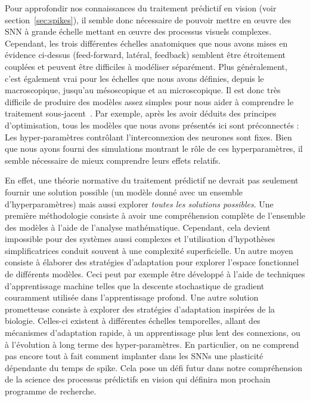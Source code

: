 Pour approfondir nos connaissances du traitement prédictif en vision
(voir section~\ref{sec:spikes}), il semble donc nécessaire de pouvoir mettre en œuvre
des SNN à grande échelle mettant en œuvre des processus visuels
complexes. Cependant, les trois différentes échelles anatomiques que
nous avons mises en évidence ci-dessus (feed-forward, latéral, feedback)
semblent être étroitement couplées et peuvent être difficiles à
modéliser séparément. Plus généralement, c'est également vrai pour les
échelles que nous avons définies, depuis le macroscopique, jusqu'au mésoscopique
et au microscopique. Il est donc très difficile de produire des modèles
assez simples pour nous aider à comprendre le traitement sous-jacent~\citep{Varoquaux19,Brette19}. Par exemple, après les avoir
déduits des principes d'optimisation, tous les modèles que nous avons
présentés ici sont préconnectés : Les hyper-paramètres contrôlant
l'interconnexion des neurones sont fixes. Bien que nous ayons fourni des
simulations montrant le rôle de ces hyperparamètres, il semble
nécessaire de mieux comprendre leurs effets relatifs. %

En effet, une théorie normative du traitement prédictif ne devrait pas
seulement fournir une solution possible (un modèle donné avec un
ensemble d'hyperparamètres) mais aussi explorer \emph{toutes les
solutions possibles}. Une première méthodologie consiste à avoir une
compréhension complète de l'ensemble des modèles à l'aide de l'analyse
mathématique. Cependant, cela devient impossible pour des systèmes aussi
complexes et l'utilisation d'hypothèses simplificatrices conduit souvent
à une complexité superficielle. Un autre moyen consiste à élaborer des
stratégies d'adaptation pour explorer l'espace fonctionnel de différents
modèles. Ceci peut par exemple être développé à l'aide de techniques
d'apprentissage machine telles que la descente stochastique de gradient
couramment utilisée dans l'apprentissage profond. Une autre solution
prometteuse consiste à explorer des stratégies d'adaptation inspirées de
la biologie. Celles-ci existent à différentes échelles
temporelles, allant des mécanismes d'adaptation rapide, à un
apprentissage plus lent des connexions, ou à l'évolution à long terme
des hyper-paramètres. En particulier, on ne comprend pas encore tout à
fait comment implanter dans les SNNs une plasticité dépendante du temps de
spike. Cela pose un défi futur dans notre compréhension de la science des
processus prédictifs en vision qui définira mon prochain programme de recherche.

